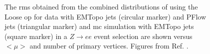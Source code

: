 \begin{figure}[htbp]
\begin{center}
\end{center}
 \caption{
 The \gls{rms} obtained from the combined distributions of \met using the Loose \met \gls{op} 
 for data with EMTopo jets (circular marker) and PFlow jets (triangular marker) and \gls{mc} simulation
with EMTopo jets (square marker) in a $Z \rightarrow ee$ event selection are shown versus  ${<}\mu{>}$ and 
 number of primary vertices. 
Figures from Ref. \cite{ATLAS-CONF-2018-023}. 
 }
  \label{fig:obj:met_fig_11}
\end{figure}



\clearpage 



